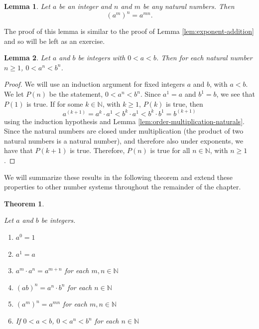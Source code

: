 \documentclass[
]{book}
\newtheorem{theorem}{Theorem}[chapter]
\newtheorem{lemma}{Lemma}[chapter]
\theoremstyle{definition}
\theoremstyle{definition}
\theoremstyle{definition}
\theoremstyle{definition}
\theoremstyle{remark}
\begin{document}
\begin{lemma}
\protect\hypertarget{lem:exponent-product}{}\label{lem:exponent-product}Let \(a\) be an integer and \(n\) and \(m\) be any natural numbers. Then \[(a^m)^n = a^{mn}.\]
\end{lemma}

The proof of this lemma is similar to the proof of Lemma \ref{lem:exponent-addition} and so will be left as an exercise.

\begin{lemma}
Let \(a\) and \(b\) be integers with \(0<a<b\). Then for each natural number \(n\geq 1\), \(0<a^n<b^n\).
\end{lemma}

\begin{proof}
We will use an induction argument for fixed integers \(a\) and \(b\), with \(a<b\). We let \(P(n)\) be the statement, \(0<a^n<b^n\). Since \(a^1=a\) and \(b^1=b\), we see that \(P(1)\) is true. If for some \(k\in \mathbb{N}\), with \(k\geq 1\), \(P(k)\) is true, then
\[a^{(k+1)}=a^k\cdot a^1 < b^k \cdot a^1 < b^k \cdot b^1 = b^{(k+1)}\] using the induction hypothesis and Lemma \ref{lem:order-multiplication-naturals}. Since the natural numbers are closed under multiplication (the product of two natural numbers is a natural number), and therefore also under exponents, we have that \(P(k+1)\) is true. Therefore, \(P(n)\) is true for all \(n\in \mathbb{N}\), with \(n\geq 1\).
\end{proof}

We will summarize these results in the following theorem and extend these properties to other number systems throughout the remainder of the chapter.

\begin{theorem}
\protect\hypertarget{thm:exponents-integers}{}\label{thm:exponents-integers}

Let \(a\) and \(b\) be integers.

\begin{enumerate}
\def\labelenumi{\alph{enumi}.}
\item
  \(a^0=1\)
\item
  \(a^1=a\)
\item
  \(a^m\cdot a^n = a^{m+n}\) for each \(m,n\in \mathbb{N}\)
\item
  \((ab)^n=a^n\cdot b^n\) for each \(n\in \mathbb{N}\)
\item
  \((a^m)^n = a^{mn}\) for each \(m,n\in \mathbb{N}\)
\item
  If \(0<a<b\), \(0<a^n<b^n\) for each \(n\in \mathbb{N}\)
\end{enumerate}

\end{theorem}
\end{document}
